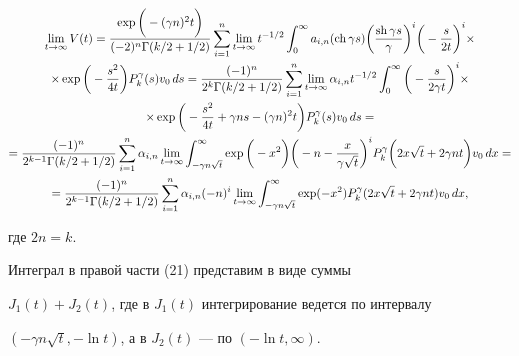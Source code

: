 \begin{multline}


\lim_{t\to\infty}V(t)=\frac{\exp\bigg(-(\gamma n)^2t\bigg)}


{(-2)^n\Gamma(k/2+1/2)} \sum_{i=1}^n \lim_{t\to\infty}


t^{-1/2}\int_0^\infty a_{i,n}(\ch \gamma s)


\bigg(\frac{\sh \gamma s}{\gamma}\bigg )^{i}


\bigg(-\frac{s}{2t}\bigg )^{i} \times\\


%


\times \exp\bigg (-\frac{s^2}{4t}\bigg ) P_k^\gamma(s)v_0\, ds=


\frac{(-1)^n}{2^k\Gamma(k/2+1/2)}\sum_{i=1}^n \lim_{t\to\infty}


\alpha_{i,n}t^{-1/2}\int_0^\infty


\bigg(-\frac{s}{2\gamma t}\bigg )^{i} \times\\


%


\times \exp\bigg (-\frac{s^2}{4t}+\gamma ns-(\gamma n)^2t \bigg )


P_k^\gamma(s)v_0\, ds=\\


%


=\frac{(-1)^n}{2^{k-1}\Gamma(k/2+1/2)}\sum_{i=1}^n


\alpha_{i,n} \lim_{t\to\infty}


\int_{-\gamma n\sqrt{t}}^\infty


\exp\bigg (-x^2\bigg )\bigg (-n-\frac{x}{\gamma \sqrt{t}}\bigg )^i


P_k^\gamma\bigg (2x\sqrt{t}+2\gamma nt\bigg )v_0\, dx=\\


%


=\frac{(-1)^n}{2^{k-1}\Gamma(k/2+1/2)}\sum_{i=1}^n \alpha_{i,n}(-n)^i


\lim_{t\to\infty}


\int_{-\gamma n\sqrt{t}}^\infty


\exp(-x^2)P_k^\gamma(2x\sqrt{t}+2\gamma nt)v_0\, dx,


\end{multline}


где $2n=k$.


Интеграл в правой части (21) представим в виде суммы


$J_1(t)+J_2(t)$, где в $J_1(t)$ интегрирование ведется по интервалу


$(-\gamma n\sqrt{t},-\ln t)$, а в $J_2(t)$ --- по $(-\ln t,\infty)$.


